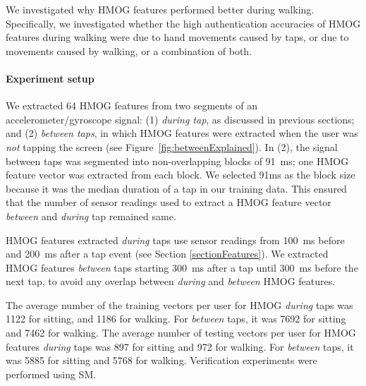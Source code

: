 %

%

%


%


%

We investigated why HMOG features performed better during walking. Specifically, we investigated whether the high authentication accuracies of HMOG features during walking were due to hand movements caused by taps, or due to movements caused by walking, or a combination of both. %

\paragraph{Experiment setup} We extracted 64 HMOG features from two segments of an accelerometer/gyroscope signal: (1) {\em during tap}, as discussed in previous sections; and (2) {\em between taps}, in which HMOG features were extracted when the user was \textit{not} tapping the screen (see Figure~\ref{fig:betweenExplained}). In (2), the signal between taps was segmented into non-overlapping blocks of 91~ms; one HMOG feature vector was extracted from each block. 
We selected 91ms as the block size because it was the median duration of a tap in our training data. This ensured that the number of sensor readings used to extract a HMOG feature vector {\em between} and {\em during} tap remained same. %

%

HMOG features extracted {\em during} taps use sensor readings from 100~ms before and 200~ms after a tap event (see Section \ref{sectionFeatures}). We extracted HMOG features {\em between} taps starting 300~ms after a tap until 300~ms before the next tap, to avoid any overlap between {\em during} and {\em between} HMOG features.%
%
%
%
%
%
 



%

%


%

%
%
%
%
%


%

%

%

%



%
%
The average number of the training vectors per user for HMOG {\em during} taps was 1122 for sitting, and 1186 for walking. For {\em between} taps, it was 7692 for sitting and 7462 for walking. %
The average number of testing vectors per user for HMOG features {\em during} taps was 897 for sitting and 972 for walking. For  {\em between} taps, it was 5885 for sitting and 5768 for walking. Verification experiments were performed using SM. 

